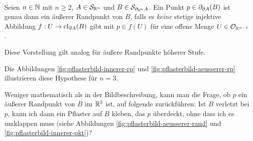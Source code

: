 

    \begin{hyp}\label{hyp:aeusserer-rand} \ \vspace{8pt}

        \noindent
        Seien $n \in \mathbb{N}$ mit $n \geq 2$, $A \in \mathcal{S}_{\mathbb{R}^n}$ und $B \in \mathcal{S}_{\partial_{\mathbb{R}^n} A}$. Ein Punkt $p \in \partial_{\partial A}(B)$ ist genau dann ein äußerer Randpunkt von $B$, falls es \textit{keine} stetige injektive Abbildung $f : U \to \text{cl}_{\partial A}(B)$ gibt mit $p \in f(U)$ für eine offene Menge $U \in \mathcal{O}_{\mathbb{R}^{n-1}}$.
    \end{hyp}
    
    Diese Vorstellung gilt analog für äußere Randpunkte höherer Stufe.
    
    Die Abbildungen \ref{fig:pflasterbild-innerer-rp} und \ref{fig:pflasterbild-aeusserer-rp} illustrieren diese Hypothese für $n=3$.
    
    

    
    
    
    Weniger
    mathematisch als in der Bildbeschreibung, kann man die Frage, ob $p$ ein äußerer Randpunkt von $B$ im $\mathbb{R}^3$ ist, auf folgende zurückführen:
    Ist $B$ verletzt bei $p$, kann ich dann ein Pflaster auf $B$ kleben, das $p$ überdeckt, ohne dass ich es umklappen muss (siehe Abbildungen \ref{fig:pflasterbild-aeusserer-rand} und \ref{fig:pflasterbild-innerer-pkt})?
    

